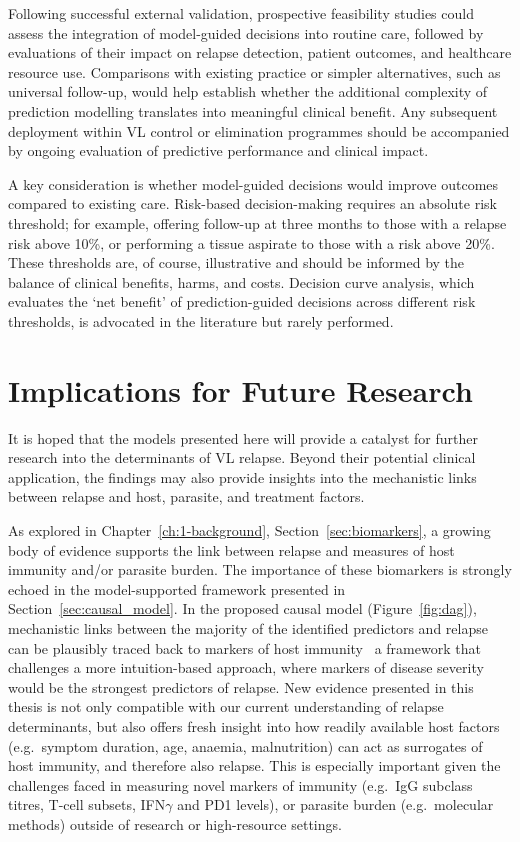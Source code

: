 \begin{mccorrection}
  Following successful external validation, prospective feasibility studies  could assess the integration of model-guided decisions into routine care, followed by evaluations of their impact on relapse detection, patient outcomes, and healthcare resource use. Comparisons with existing practice or simpler alternatives, such as universal follow-up, would help establish whether the additional complexity of prediction modelling translates into meaningful clinical benefit. Any subsequent deployment within VL control or elimination programmes should be accompanied by ongoing evaluation of predictive performance and clinical impact.

\end{mccorrection}

A key consideration is whether model-guided decisions would improve outcomes compared to existing care. Risk-based decision-making requires an absolute risk threshold; for example, offering follow-up at three months to those with a relapse risk above 10\%, or performing a tissue aspirate to those with a risk above 20\%. These thresholds are, of course, illustrative and should be informed by the balance of clinical benefits, harms, and costs. Decision curve analysis, which evaluates the `net benefit' of prediction-guided decisions across different risk thresholds, is advocated in the literature but rarely performed\cite{vickers2016}.

\section{Implications for Future Research\label{sec:future-research}}

It is hoped that the models presented here will provide a catalyst for further research into the determinants of VL relapse. Beyond their potential clinical application, the findings may also provide insights into the mechanistic links between relapse and host, parasite, and treatment factors.

As explored in Chapter~\ref{ch:1-background}, Section~\ref{sec:biomarkers}, a growing body of evidence supports the link between relapse and measures of host immunity and/or parasite burden. The importance of these biomarkers is strongly echoed in the model-supported framework presented in Section~\ref{sec:causal_model}. In the proposed causal model (Figure~\ref{fig:dag}), mechanistic links between the majority of the identified predictors and relapse can be plausibly traced back to markers of host immunity \textemdash\ a framework that challenges a more intuition-based approach, where markers of disease severity would be the strongest predictors of relapse. New evidence presented in this thesis is not only compatible with our current understanding of relapse determinants, but also offers fresh insight into how readily available host factors (e.g.\ symptom duration, age, anaemia, malnutrition) can act as surrogates of host immunity, and therefore also relapse. This is especially important given the challenges faced in measuring novel markers of immunity (e.g.\ IgG subclass titres, T-cell subsets, IFN$\gamma$ and PD1 levels), or parasite burden (e.g.\ molecular methods) outside of research or high-resource settings.


